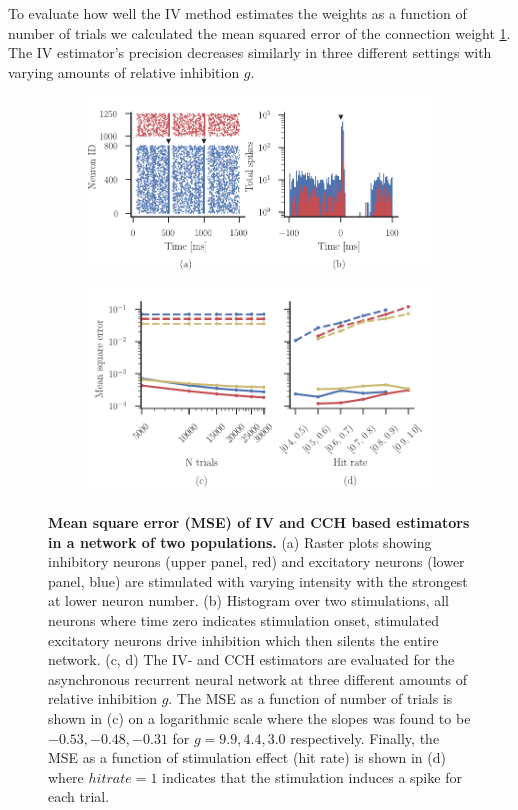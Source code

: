 \documentclass[11pt]{article}
\begin{document}
To evaluate how well the IV method estimates the weights as a function of number of trials we calculated the mean squared error of the connection weight \cref{fig:error}. 
The IV estimator's precision decreases similarly in three different settings with varying amounts of relative inhibition $ g $.
\begin{figure}
\makeatletter
\renewcommand\p@subfigure{}
\makeatother
\begin{subfigure}{\textwidth} 
\includegraphics[scale=1]{network-raster}
\end{subfigure}\medskip

\begin{subfigure}{\textwidth} 
\includegraphics[scale=1]{mse}
\end{subfigure}

\caption{{\bf Mean square error (MSE) of IV and CCH based estimators in a network of two populations.} 
(a) Raster plots showing inhibitory neurons (upper panel, red) and excitatory neurons (lower panel, blue) are stimulated with varying intensity with the strongest at lower neuron number.
(b) Histogram over two stimulations, all neurons where time zero indicates stimulation onset, stimulated excitatory neurons drive inhibition which then silents the entire network.
(c, d) The IV- and CCH estimators are evaluated for the asynchronous recurrent neural network at three different amounts of relative inhibition $ g $. 
The MSE as a function of number of trials is shown in (c) on a logarithmic scale where the slopes was found to be $ -0.53, -0.48, -0.31 $ for $g = 9.9, 4.4, 3.0$ respectively. 
Finally, the MSE as a function of stimulation effect (hit rate) is shown in (d) where $hit rate = 1$ indicates that the stimulation induces a spike for each trial. \label{fig:error}}
\end{figure}
\end{document}
